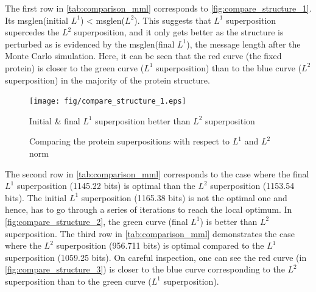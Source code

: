 \documentclass[wcp]{jmlr}
\begin{document}
The first row in \autoref{tab:comparison_mml} corresponds to \autoref{fig:compare_structure_1}.
Its msglen(initial $L^1$) < msglen($L^2$). This suggests that $L^1$ superposition supercedes 
the $L^2$ superposition, and it only gets better
as the structure is perturbed as is evidenced by the msglen(final $L^1$), the message length
after the Monte Carlo simulation. Here, it can be seen that the red curve (the fixed protein) 
is closer to the green curve ($L^1$ superposition) than to the blue curve ($L^2$ superposition)
in the majority of the protein structure.
\begin{figure}[!htb]
\centering
\texttt{[image: fig/compare\_structure\_1.eps]}
\label{fig:compare_structure_1}
\caption{Initial \& final $L^1$ superposition better than $L^2$ superposition}
\end{figure}
\begin{figure}[!htb]
  \centering
    \hspace{0.5cm}
    \caption{Comparing the protein superpositions with respect to $L^1$ and $L^2$ norm}
    \label{fig:protein_superposition}
\end{figure}
The second row in \autoref{tab:comparison_mml} corresponds to the case where the final $L^1$
superposition (1145.22 bits) is optimal than the $L^2$ superposition (1153.54 bits). The initial
$L^1$ superposition (1165.38 bits) is not the optimal one and hence, has to go through a series of
iterations to reach the local optimum. In \autoref{fig:compare_structure_2}, the green curve 
(final $L^1$) is better than $L^2$ superposition.
The third row in \autoref{tab:comparison_mml} demonstrates the case where the $L^2$ superposition
(956.711 bits) is optimal compared to the $L^1$ superposition (1059.25 bits). On careful 
inspection, one can see the red curve (in \autoref{fig:compare_structure_3}) is closer
to the blue curve corresponding to the $L^2$ superposition than to the green curve ($L^1$ superposition).
\end{document}
